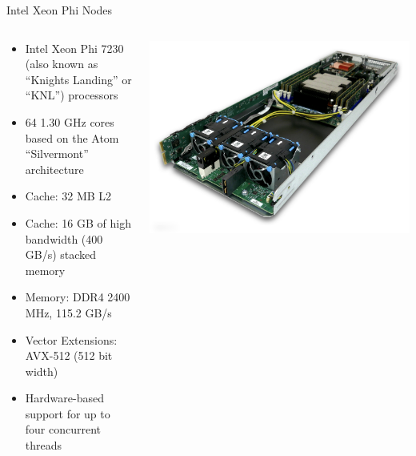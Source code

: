 \begin{frame}{Intel Xeon Phi Nodes}
\begin{columns}
\begin{column}{0.7\textwidth}
\begin{itemize}
\item Intel Xeon Phi 7230 (also known as ``Knights Landing'' or ``KNL'') processors
\item 64 1.30 GHz cores based on the Atom ``Silvermont'' architecture
\item Cache: 32 MB L2
\item Cache: 16 GB of high bandwidth (400 GB/s) stacked memory
\item Memory: DDR4 2400 MHz, 115.2 GB/s
\item Vector Extensions: AVX-512 (512 bit width)
\item Hardware-based support for up to four concurrent threads
\end{itemize}
\end{column}
\begin{column}{0.3\textwidth}
\begin{center}
\includegraphics[width=\textwidth]{figures/mic_sled.jpg}
\end{center}
\end{column}
\end{columns}
\end{frame}

